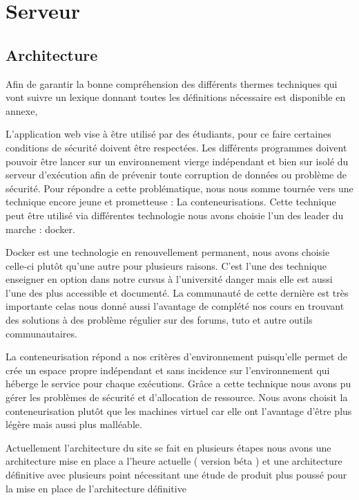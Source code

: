 \chapter{Serveur}

\section{Architecture}

\par Afin de garantir la bonne compréhension des différents thermes techniques qui vont suivre un lexique donnant toutes les définitions nécessaire est disponible en annexe,

\par L’application web vise à être utilisé par des étudiants, pour ce faire certaines conditions de sécurité doivent être respectées. Les différents programmes doivent pouvoir être lancer sur un environnement vierge indépendant et bien sur isolé du serveur d’exécution afin de prévenir toute corruption de données ou problème de sécurité. Pour répondre a cette problématique, nous nous somme tournée vers une technique encore jeune et prometteuse : La conteneurisations. Cette technique peut être utilisé via différentes technologie nous avons choisie l’un des leader du marche : docker.

\par Docker est une technologie en renouvellement permanent, nous avons choisie celle-ci plutôt qu’une autre pour plusieurs raisons. C’est l’une des technique enseigner en option dans notre cursus à l’université danger mais elle est aussi l’une des plus accessible et documenté. La communauté de cette dernière est très importante celas nous donné aussi l’avantage de complété nos cours en trouvant des solutions à des problème régulier sur des forums, tuto et autre outils communautaires.

\par La conteneurisation répond a nos critères d’environnement puisqu’elle permet de crée un espace propre indépendant et sans incidence sur l’environnement qui héberge le service pour chaque exécutions. Grâce a cette technique nous avons pu gérer les problèmes de sécurité et d’allocation de ressource. Nous avons choisit la conteneurisation plutôt que les machines virtuel car elle ont l’avantage d’être plus légère mais aussi plus malléable.  

\par Actuellement l’architecture du site se fait en plusieurs étapes nous avons une architecture mise en place a l’heure actuelle ( version béta ) et une architecture définitive avec plusieurs point nécessitant une étude de produit plus poussé pour la mise en place de l’architecture définitive 

